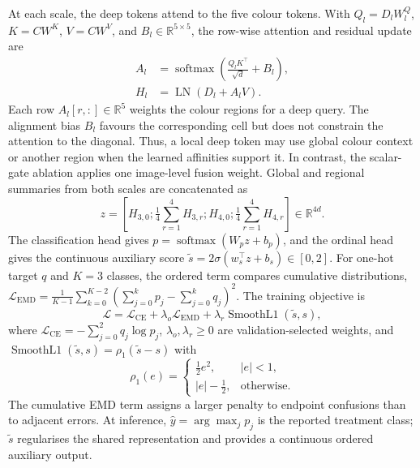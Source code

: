 \documentclass[10pt,letterpaper,twocolumn]{article}
\begin{document}
At each scale, the deep tokens attend to the five colour tokens. With $Q_l=D_lW_l^Q$, $K=CW^K$, $V=CW^V$, and $B_l\in\mathbb{R}^{5\times5}$, the row-wise attention and residual update are
\begin{equation}
\begin{aligned}
A_l&=\operatorname{softmax}\!\left(\frac{Q_lK^\top}{\sqrt d}+B_l\right),\\[-2pt]
H_l&=\operatorname{LN}(D_l+A_lV).
\end{aligned}
\label{eq:attention}
\end{equation}
Each row $A_l[r,:]\in\mathbb{R}^{5}$ weights the colour regions for a deep query. The alignment bias $B_l$ favours the corresponding cell but does not constrain the attention to the diagonal. Thus, a local deep token may use global colour context or another region when the learned affinities support it. In contrast, the scalar-gate ablation applies one image-level fusion weight. Global and regional summaries from both scales are concatenated as
\begin{equation}
z=[H_{3,0};\tfrac14\sum_{r=1}^{4}H_{3,r};H_{4,0};\tfrac14\sum_{r=1}^{4}H_{4,r}]\in\mathbb{R}^{4d}.
\label{eq:aggregate}
\end{equation}
The classification head gives $p=\operatorname{softmax}(W_pz+b_p)$, and the ordinal head gives the continuous auxiliary score $\tilde{s}=2\sigma(w_s^\top z+b_s)\in[0,2]$. For one-hot target $q$ and $K=3$ classes, the ordered term compares cumulative distributions, $\mathcal L_{\mathrm{EMD}}=\frac{1}{K-1}\sum_{k=0}^{K-2}(\sum_{j=0}^{k}p_j-\sum_{j=0}^{k}q_j)^2$. The training objective is
\begin{equation}
\mathcal L=\mathcal L_{\mathrm{CE}}+\lambda_o\mathcal L_{\mathrm{EMD}}+
\lambda_r\operatorname{SmoothL1}(\tilde{s},s),
\label{eq:loss}
\end{equation}
where $\mathcal L_{\mathrm{CE}}=-\sum_{j=0}^{2}q_j\log p_j$, $\lambda_o,\lambda_r\geq0$ are validation-selected weights, and $\operatorname{SmoothL1}(\tilde{s},s)=\rho_1(\tilde{s}-s)$ with
\begin{equation}
\rho_1(e)=
\begin{cases}
\tfrac12e^2, & |e|<1,\\[-2pt]
|e|-\tfrac12, & \text{otherwise}.
\end{cases}
\label{eq:smoothl1}
\end{equation}
The cumulative EMD term assigns a larger penalty to endpoint confusions than to adjacent errors. At inference, $\hat y=\arg\max_jp_j$ is the reported treatment class; $\tilde{s}$ regularises the shared representation and provides a continuous ordered auxiliary output.
\end{document}
